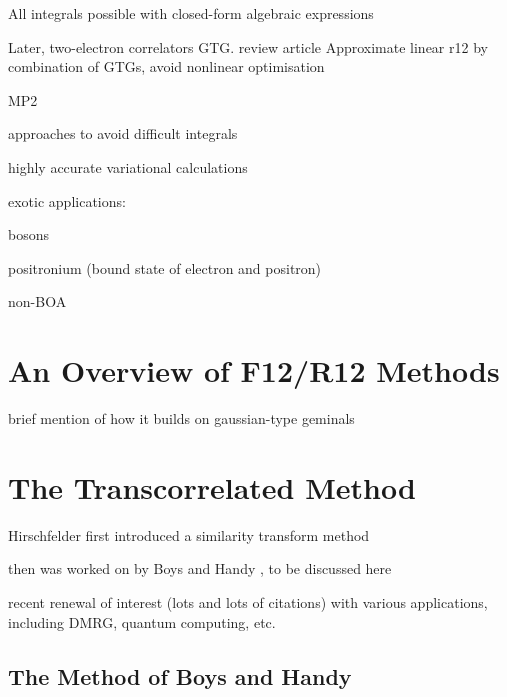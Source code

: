 All integrals possible with closed-form algebraic expressions\cite{lesterGaussian1964}

Later, two-electron correlators \gls{GTG}. review article \cite{mitroyTheory2013} Approximate linear r12 by combination of GTGs, avoid nonlinear optimisation \cite{bukowskiNew1994,perssonAccurate1996}

MP2\cite{panGaussian1970,panElectron1972}


approaches to avoid difficult integrals\cite{szalewiczNew1982,szalewiczAtomic1983,wenzelAtomic1986,szalewiczAtomic1984,tewWeak2007}

highly accurate variational calculations \cite{korobovCoulomb2000}

exotic applications:

bosons \cite{vargaPrecise1995}

positronium (bound state of electron and positron) \cite{bubinGroundstate2011}

non-BOA \cite{stankeNonBornOppenheimer2009}


\section{An Overview of F12/R12 Methods}

brief mention of how it builds on gaussian-type geminals


\section{The Transcorrelated Method}
\label{sec:tc}

Hirschfelder first introduced a similarity transform method \cite{hirschfelderRemoval1963}

then was worked on by Boys and Handy , to be discussed here

recent renewal of interest (lots and lots of citations) with various applications, including DMRG, quantum computing, etc.


\subsection{The Method of Boys and Handy}


